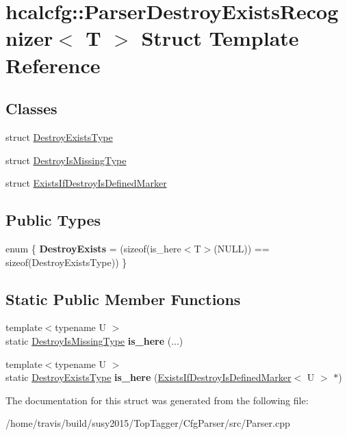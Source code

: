 \hypertarget{structhcalcfg_1_1ParserDestroyExistsRecognizer}{\section{hcalcfg\-:\-:Parser\-Destroy\-Exists\-Recognizer$<$ T $>$ Struct Template Reference}
\label{structhcalcfg_1_1ParserDestroyExistsRecognizer}
}
\subsection*{Classes}
\begin{DoxyCompactItemize}
\item 
struct \hyperlink{structhcalcfg_1_1ParserDestroyExistsRecognizer_1_1DestroyExistsType}{Destroy\-Exists\-Type}
\item 
struct \hyperlink{structhcalcfg_1_1ParserDestroyExistsRecognizer_1_1DestroyIsMissingType}{Destroy\-Is\-Missing\-Type}
\item 
struct \hyperlink{structhcalcfg_1_1ParserDestroyExistsRecognizer_1_1ExistsIfDestroyIsDefinedMarker}{Exists\-If\-Destroy\-Is\-Defined\-Marker}
\end{DoxyCompactItemize}
\subsection*{Public Types}
\begin{DoxyCompactItemize}
\item 
enum \{ {\bfseries Destroy\-Exists} = (sizeof(is\-\_\-here$<$T$>$(N\-U\-L\-L)) == sizeof(Destroy\-Exists\-Type))
 \}
\end{DoxyCompactItemize}
\subsection*{Static Public Member Functions}
\begin{DoxyCompactItemize}
\item 
\hypertarget{structhcalcfg_1_1ParserDestroyExistsRecognizer_af68a10598ce38579f5c9a2fa9fb50d3a}{{\footnotesize template$<$typename U $>$ }\\static \hyperlink{structhcalcfg_1_1ParserDestroyExistsRecognizer_1_1DestroyIsMissingType}{Destroy\-Is\-Missing\-Type} {\bfseries is\-\_\-here} (...)}\label{structhcalcfg_1_1ParserDestroyExistsRecognizer_af68a10598ce38579f5c9a2fa9fb50d3a}

\item 
\hypertarget{structhcalcfg_1_1ParserDestroyExistsRecognizer_a91e99c149cfc18d4d3ba65efd2eb41ef}{{\footnotesize template$<$typename U $>$ }\\static \hyperlink{structhcalcfg_1_1ParserDestroyExistsRecognizer_1_1DestroyExistsType}{Destroy\-Exists\-Type} {\bfseries is\-\_\-here} (\hyperlink{structhcalcfg_1_1ParserDestroyExistsRecognizer_1_1ExistsIfDestroyIsDefinedMarker}{Exists\-If\-Destroy\-Is\-Defined\-Marker}$<$ U $>$ $\ast$)}\label{structhcalcfg_1_1ParserDestroyExistsRecognizer_a91e99c149cfc18d4d3ba65efd2eb41ef}

\end{DoxyCompactItemize}


The documentation for this struct was generated from the following file\-:\begin{DoxyCompactItemize}
\item 
/home/travis/build/susy2015/\-Top\-Tagger/\-Cfg\-Parser/src/Parser.\-cpp\end{DoxyCompactItemize}
